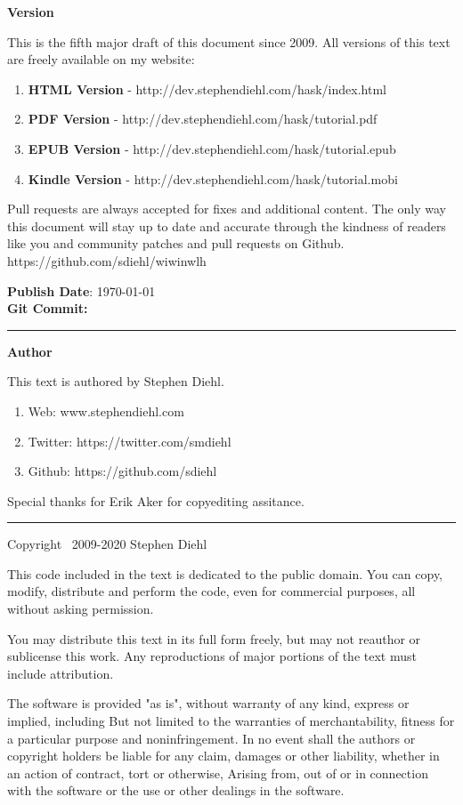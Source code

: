 \Large\textbf{Version}
\normalsize

This is the fifth major draft of this document since 2009. All versions of this
text are freely available on my website:

\begin{enumerate}
\item \textbf{HTML Version}   - http://dev.stephendiehl.com/hask/index.html
\item \textbf{PDF Version}    - http://dev.stephendiehl.com/hask/tutorial.pdf
\item \textbf{EPUB Version}   - http://dev.stephendiehl.com/hask/tutorial.epub
\item \textbf{Kindle Version} - http://dev.stephendiehl.com/hask/tutorial.mobi
\end{enumerate}

Pull requests are always accepted for fixes and additional content.  The only
way this document will stay up to date and accurate through the kindness of
readers like you and community patches and pull requests on Github.
https://github.com/sdiehl/wiwinwlh

\textbf{Publish Date}: \today \\
\textbf{Git Commit:} \texttt{}

\par\noindent\rule{\textwidth}{0.4pt}

\Large\textbf{Author}
\normalsize

This text is authored by Stephen Diehl.

\begin{enumerate}
\item Web: www.stephendiehl.com
\item Twitter: https://twitter.com/smdiehl
\item Github: https://github.com/sdiehl
\end{enumerate}

Special thanks for Erik Aker for copyediting assitance.

\par\noindent\rule{\textwidth}{0.4pt}

Copyright \textcopyright \ 2009-2020 Stephen Diehl

This code included in the text is dedicated to the public domain.  You can copy,
modify, distribute and perform the code, even for commercial purposes, all
without asking permission.

You may distribute this text in its full form freely, but may not reauthor or
sublicense this work. Any reproductions of major portions of the text must
include attribution.

The software is provided "as is", without warranty of any kind, express or
implied, including But not limited to the warranties of merchantability, fitness
for a particular purpose and noninfringement. In no event shall the authors or
copyright holders be liable for any claim, damages or other liability, whether
in an action of contract, tort or otherwise, Arising from, out of or in
connection with the software or the use or other dealings in the software.
